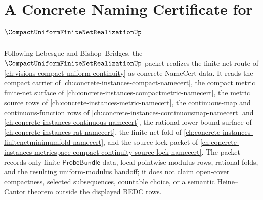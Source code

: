 \chapter{A Concrete Naming Certificate for $\CompactUniformFiniteNetRealizationUp$}
\label{ch:concrete-instances-compact-uniform-finite-net-realization-namecert}

Following Lebesgue and Bishop--Bridges, the $\CompactUniformFiniteNetRealizationUp$ packet realizes the finite-net route of \autoref{ch:visions-compact-uniform-continuity} as concrete NameCert data. It reads the compact carrier of \autoref{ch:concrete-instances-compact-namecert}, the compact metric finite-net surface of \autoref{ch:concrete-instances-compactmetric-namecert}, the metric source rows of \autoref{ch:concrete-instances-metric-namecert}, the continuous-map and continuous-function rows of \autoref{ch:concrete-instances-continuousmap-namecert} and \autoref{ch:concrete-instances-continuous-namecert}, the rational lower-bound surface of \autoref{ch:concrete-instances-rat-namecert}, the finite-net fold of \autoref{ch:concrete-instances-finitenetminimumfold-namecert}, and the source-lock packet of \autoref{ch:concrete-instances-metricspace-compact-continuity-source-lock-namecert}. The packet records only finite $\mathsf{ProbeBundle}$ data, local pointwise-modulus rows, rational folds, and the resulting uniform-modulus handoff; it does not claim open-cover compactness, selected subsequences, countable choice, or a semantic Heine--Cantor theorem outside the displayed BEDC rows.

